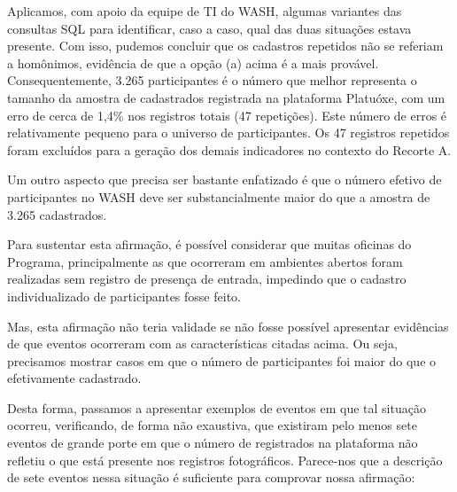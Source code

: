 Aplicamos, com apoio da equipe de TI do WASH, algumas variantes das consultas SQL para identificar, caso a caso, qual das duas situações estava presente. Com isso, pudemos concluir que os cadastros repetidos não se referiam a homônimos, evidência de que a opção (a) acima é a mais provável. Consequentemente, 3.265 participantes é o número que melhor representa o tamanho da amostra de cadastrados registrada na plataforma Platuóxe,  com um erro de cerca de 1,4\% nos registros totais (47 repetições). Este número de erros é relativamente pequeno para o universo de participantes. Os 47 registros repetidos foram excluídos para a geração dos demais indicadores no contexto do Recorte A.


\noindent\begin{flushright}\mbox{\linespread{1}\selectfont\centering{}}\end{flushright}


Um outro aspecto que precisa ser bastante enfatizado é que o número efetivo de participantes no WASH deve ser substancialmente maior do que a amostra de 3.265 cadastrados.

Para sustentar esta afirmação, é possível considerar que muitas oficinas do Programa, principalmente as que ocorreram em ambientes abertos foram realizadas sem registro de presença  de entrada, impedindo que o cadastro individualizado de participantes fosse feito.

Mas, esta afirmação não teria validade se não fosse possível apresentar evidências de que eventos ocorreram com as características citadas acima. Ou seja, precisamos mostrar casos em que o número de participantes foi maior do que o efetivamente cadastrado.

Desta forma, passamos a apresentar exemplos de eventos em que tal situação ocorreu, verificando, de forma não exaustiva, que existiram pelo menos sete eventos de grande porte em que o número de registrados na plataforma não refletiu o que está presente nos registros fotográficos. Parece-nos que a descrição de sete eventos nessa situação é suficiente para comprovar nossa afirmação:


